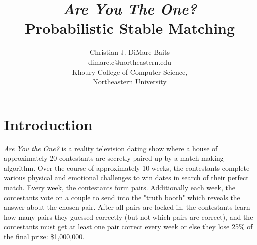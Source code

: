 \documentclass{article}
\title{
  \textit{Are You The One?} \\
  Probabilistic Stable Matching
}
\author{
    Christian J. DiMare-Baits \\
    dimare.c@northeastern.edu \\
    Khoury College of Computer Science, \\
    Northeastern University
}
\newcommand{\comment}[1]{}
\begin{document}
\maketitle

\comment{
Please submit your final project report as a single document
in PDF format. You should not upload datasets or code; rather,
you should host these files on Dropbox, GitHub, or some other
external website. You should provide links to these external
resources in your report.

Your report should be at least five pages long and cover the
following topics:

\begin{itemize}
  \item What is the problem you were trying to solve and what
        were your results?
  \item What data, if any, did you collect?
  \item What algorithms or methods did you try?
  \item What were the results of your implementation and/or
        experiments and what conclusions do you draw from them?
  \item What milestones in your grade contract did you
        achieve?
  \item For group projects, what did each team member
        contribute?
\end{itemize}

Feel free to include examples, figures, or small snippets of
code, if it helps your explanations. In general, however, as
noted above, the full data and code should not be part of the
report you submit but hosted externally.
}

\section{Introduction}\label{sec:introduction}

\textit{Are You the One?} is a reality television dating show where
a house of approximately 20 contestants are secretly paired up
by a match-making algorithm. Over the course of approximately
10 weeks, the contestants complete various physical and emotional
challenges to win dates in search of their perfect match. Every
week, the contestants form pairs. Additionally each week, the
contestants vote on a couple to send into the "truth booth" which
reveals the answer about the chosen pair. After all pairs are
locked in, the contestants learn how many pairs they guessed
correctly (but not which pairs are correct), and the contestants
must get at least one pair correct every week or else they lose
25\% of the final prize: \$1,000,000.
\end{document}
